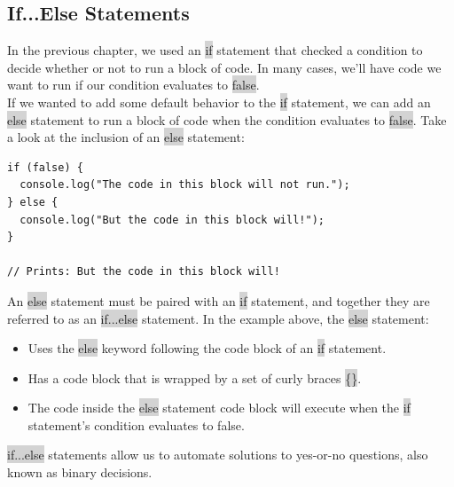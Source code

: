\documentclass[11pt]{article}
\begin{document}
\subsection{If...Else Statements}
In the previous chapter, we used an \colorbox{lightgray}{if} statement that checked a condition to decide whether or not to run a block of code. In many cases, we’ll have code we want to run if our condition evaluates to \colorbox{lightgray}{false}. \\
\newline
If we wanted to add some default behavior to the \colorbox{lightgray}{if} statement, we can add an \colorbox{lightgray}{else} statement to run a block of code when the condition evaluates to \colorbox{lightgray}{false}. Take a look at the inclusion of an \colorbox{lightgray}{else} statement: 
\begin{lstlisting}
if (false) {
  console.log("The code in this block will not run.");
} else {
  console.log("But the code in this block will!");
}

// Prints: But the code in this block will!
\end{lstlisting}
An \colorbox{lightgray}{else} statement must be paired with an \colorbox{lightgray}{if} statement, and together they are referred to as an \colorbox{lightgray}{if...else} statement. In the example above, the \colorbox{lightgray}{else} statement:
\begin{itemize}[leftmargin = *]
\item Uses the \colorbox{lightgray}{else} keyword following the code block of an \colorbox{lightgray}{if} statement.
\item Has a code block that is wrapped by a set of curly braces \colorbox{lightgray}{\{\}}.
\item The code inside the \colorbox{lightgray}{else} statement code block will execute when the \colorbox{lightgray}{if} statement’s condition evaluates to false.
\end{itemize}
\colorbox{lightgray}{if...else} statements allow us to automate solutions to yes-or-no questions, also known as binary decisions.
\end{document}
